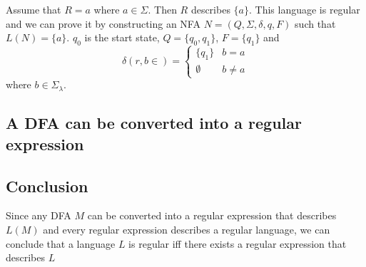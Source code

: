 \documentclass{article}
\newcommand{\emptyString}{\lambda}
\begin{document}
Assume that \(R=a\) where \(a\in\Sigma\). Then \(R\) describes \(\{a\}\).
This language is regular and we can prove it by constructing an NFA \(N=(Q, \Sigma, \delta, q, F)\)
such that \(L(N)=\{a\}\).
\(q_0\) is the start state, \(Q=\{q_0, q_1\}\), \(F=\{q_1\}\) and
\[
    \delta(r,b \in ) =
    \begin{cases}
        \{q_1\} & b=a\\
        \emptyset & b \neq a
    \end{cases}
\]
where \(b\in\Sigma_\emptyString\).
\wrapfill

\subsection{A DFA can be converted into a regular expression}

\subsection{Conclusion}

Since any DFA \(M\) can be converted into a regular expression that describes \(L(M)\)
and every regular expression describes a regular language, we can conclude that a language \(L\)
is regular iff there exists a regular expression that describes \(L\)
\end{document}
